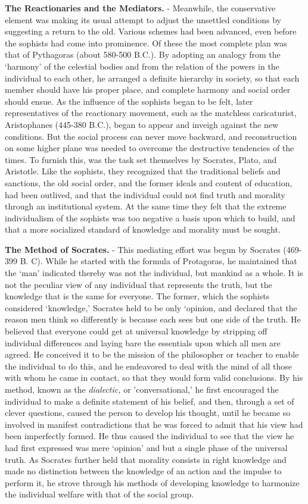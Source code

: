 \documentclass[
]{book}
\begin{document}
\textbf{The Reactionaries and the Mediators.} - Meanwhile, the conservative element was making its usual attempt to adjust the unsettled conditions by suggesting a return to the old. Various schemes had been advanced, even before the sophists had come into prominence. Of these the most complete plan was that of Pythagoras (about 580-500 B.C.). By adopting an analogy from the `harmony' of the celestial bodies and from the relation of the powers in the individual to each other, he arranged a definite hierarchy in society, so that each member should have his proper place, and complete harmony and social order should ensue. As the influence of the sophists began to be felt, later representatives of the reactionary movement, such as the matchless caricaturist, Aristophanes (445-380 B.C.), began to appear and inveigh against the new conditions. But the social process can never move backward, and reconstruction on some higher plane was needed to overcome the destructive tendencies of the times. To furnish this, was the task set themselves by Socrates, Plato, and Aristotle. Like the sophists, they recognized that the traditional beliefs and sanctions, the old social order, and the former ideals and content of education, had been outlived, and that the individual could not find truth and morality through an institutional system. At the same time they felt that the extreme individualism of the sophists was too negative a basis upon which to build, and that a more socialized standard of knowledge and morality must be sought.

\textbf{The Method of Socrates.} - This mediating effort was begun by Socrates (469-399 B. C). While he started with the formula of Protagoras, he maintained that the `man' indicated thereby was not the individual, but mankind as a whole. It is not the peculiar view of any individual that represents the truth, but the knowledge that is the same for everyone. The former, which the sophists considered `knowledge,' Socrates held to be only `opinion, and declared that the reason men think so differently is because each sees but one side of the truth. He believed that everyone could get at universal knowledge by stripping off individual differences and laying bare the essentials upon which all men are agreed. He conceived it to be the mission of the philosopher or teacher to enable the individual to do this, and he endeavored to deal with the mind of all those with whom he came in contact, so that they would form valid conclusions. By his method, known as the \emph{dialectic,} or 'conversational,' he first encouraged the individual to make a definite statement of his belief, and then, through a set of clever questions, caused the person to develop his thought, until he became so involved in manifest contradictions that he was forced to admit that his view had been imperfectly formed. He thus caused the individual to see that the view he had first expressed was mere `opinion' and but a single phase of the universal truth. As Socrates further held that morality consists in right knowledge and made no distinction between the knowledge of an action and the impulse to perform it, he strove through his methods of developing knowledge to harmonize the individual welfare with that of the social group.
\end{document}
